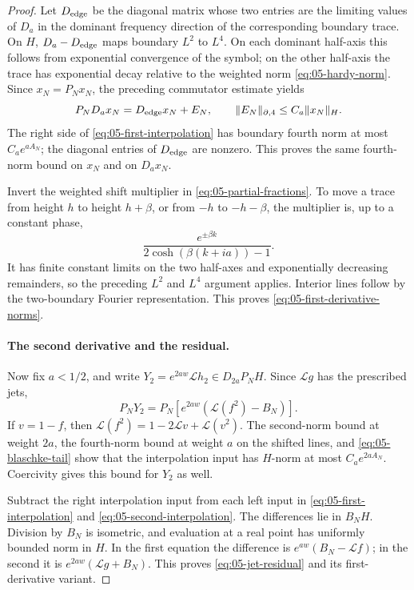 \begin{proof}
Let \(D_{\rm edge}\) be the diagonal matrix whose two entries are the limiting values of \(D_a\) in the dominant frequency direction of the corresponding boundary trace. On \(H\), \(D_a-D_{\rm edge}\) maps boundary \(L^2\) to \(L^4\). On each dominant half-axis this follows from exponential convergence of the symbol; on the other half-axis the trace has exponential decay relative to the weighted norm \eqref{eq:05-hardy-norm}. Since \(x_N=P_Nx_N\), the preceding commutator estimate yields
\[
 P_ND_ax_N=D_{\rm edge}x_N+E_N,
 \qquad \|E_N\|_{\partial,4}\le C_a\|x_N\|_H.
\]
The right side of \eqref{eq:05-first-interpolation} has boundary fourth norm at most \(C_ae^{aA_N}\); the diagonal entries of \(D_{\rm edge}\) are nonzero. This proves the same fourth-norm bound on \(x_N\) and on \(D_ax_N\).

Invert the weighted shift multiplier in \eqref{eq:05-partial-fractions}. To move a trace from height \(h\) to height \(h+\beta\), or from \(-h\) to \(-h-\beta\), the multiplier is, up to a constant phase,
\[
 \frac{e^{\pm\beta k}}{2\cosh(\beta(k+ia))-1}.
\]
It has finite constant limits on the two half-axes and exponentially decreasing remainders, so the preceding \(L^2\) and \(L^4\) argument applies. Interior lines follow by the two-boundary Fourier representation. This proves \eqref{eq:05-first-derivative-norms}.

\paragraph{The second derivative and the residual.}
Now fix \(a<1/2\), and write
\(Y_2=e^{2aw}\mathscr Lh_2\in D_{2a}P_NH\).
Since \(\mathscr Lg\) has the prescribed jets,
\begin{equation}
 P_NY_2=P_N[e^{2aw}(\mathscr L(f^2)-B_N)].
 \label{eq:05-second-interpolation}
\end{equation}
If \(v=1-f\), then \(\mathscr L(f^2)=1-2\mathscr Lv+\mathscr L(v^2)\). The second-norm bound at weight \(2a\), the fourth-norm bound at weight \(a\) on the shifted lines, and \eqref{eq:05-blaschke-tail} show that the interpolation input has \(H\)-norm at most \(C_ae^{2aA_N}\). Coercivity gives this bound for \(Y_2\) as well.

Subtract the right interpolation input from each left input in \eqref{eq:05-first-interpolation} and \eqref{eq:05-second-interpolation}. The differences lie in \(B_NH\). Division by \(B_N\) is isometric, and evaluation at a real point has uniformly bounded norm in \(H\). In the first equation the difference is
\(e^{aw}(B_N-\mathscr Lf)\); in the second it is
\(e^{2aw}(\mathscr Lg+B_N)\).
This proves \eqref{eq:05-jet-residual} and its first-derivative variant.
\end{proof}

